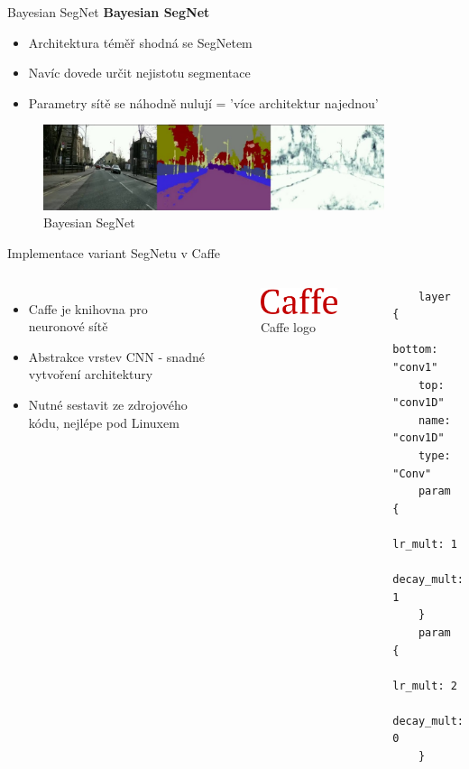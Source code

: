 \documentclass[aspectratio=1610]{beamer}
\begin{document}
\begin{frame}{Bayesian SegNet}
\textbf{Bayesian SegNet}
\begin{itemize}
	\item Architektura téměř shodná se SegNetem 
	\item Navíc dovede určit nejistotu segmentace
	\item Parametry sítě se náhodně nulují = 'více architektur najednou'
\end{itemize}
\vspace{5mm}
\begin{figure}[h]
	\begin{center}
		\includegraphics[width=10cm, keepaspectratio]{bayesian.jpg}
	\end{center}
	\caption{Bayesian SegNet} 	
\end{figure}
\end{frame}
\begin{frame}[fragile]{Implementace variant SegNetu v Caffe}
	\begin{columns}
		\begin{itemize}	
			\item Caffe je knihovna pro neuronové sítě		
			\item Abstrakce vrstev CNN - snadné vytvoření architektury
			\item Nutné sestavit ze zdrojového kódu, nejlépe pod Linuxem		
		\end{itemize}
		\vspace{5mm}
		\begin{figure}[h]
			\begin{center}
				\includegraphics[width=4cm, keepaspectratio]{caffe-logo.png}
			\end{center}	
			\caption{Caffe logo} 	
		\end{figure}
	
\begin{lstlisting}
	layer {
	bottom: "conv1"
	top: "conv1D"
	name: "conv1D"
	type: "Conv"
	param {
	lr_mult: 1
	decay_mult: 1
	}
	param {
	lr_mult: 2
	decay_mult: 0
	}			
	\end{lstlisting}		
	\end{columns}
\end{frame}
\end{document}
